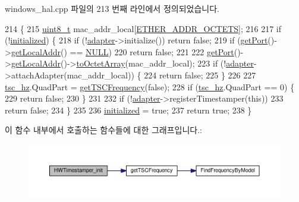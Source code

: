 windows\+\_\+hal.\+cpp 파일의 213 번째 라인에서 정의되었습니다.


\begin{DoxyCode}
214 \{
215     \hyperlink{stdint_8h_aba7bc1797add20fe3efdf37ced1182c5}{uint8\_t} mac\_addr\_local[\hyperlink{ptptypes_8hpp_ab81d402a4929723091a6731508845125}{ETHER\_ADDR\_OCTETS}];
216 
217     \textcolor{keywordflow}{if} (!\hyperlink{class_windows_wireless_timestamper_aedeffc7d23da25d52b9a50045189fe2b}{initialized}) \{
218         \textcolor{keywordflow}{if} (!\hyperlink{structadapter}{adapter}->initialize()) \textcolor{keywordflow}{return} \textcolor{keyword}{false};
219         \textcolor{keywordflow}{if} (\hyperlink{class_wireless_timestamper_aad42db1d6ccc40f2bebc5ba544d738d8}{getPort}()->\hyperlink{class_common_port_ab6607250666be12220407c6c12671f65}{getLocalAddr}() == \hyperlink{openavb__types__base__pub_8h_a070d2ce7b6bb7e5c05602aa8c308d0c4}{NULL})
220             \textcolor{keywordflow}{return} \textcolor{keyword}{false};
221 
222         \hyperlink{class_wireless_timestamper_aad42db1d6ccc40f2bebc5ba544d738d8}{getPort}()->\hyperlink{class_common_port_ab6607250666be12220407c6c12671f65}{getLocalAddr}()->\hyperlink{class_link_layer_address_a1e2896b540d2ea6182d351332737db91}{toOctetArray}(mac\_addr\_local);
223         \textcolor{keywordflow}{if} (!\hyperlink{structadapter}{adapter}->attachAdapter(mac\_addr\_local)) \{
224             \textcolor{keywordflow}{return} \textcolor{keyword}{false};
225         \}
226 
227         \hyperlink{class_windows_wireless_timestamper_a259066718bc34c6231bbefd0b7093b6e}{tsc\_hz}.QuadPart = \hyperlink{tsc_8hpp_a9da55c09944ef0da0cd43fcd0a5a3ee3}{getTSCFrequency}(\textcolor{keyword}{false});
228         \textcolor{keywordflow}{if} (\hyperlink{class_windows_wireless_timestamper_a259066718bc34c6231bbefd0b7093b6e}{tsc\_hz}.QuadPart == 0) \{
229             \textcolor{keywordflow}{return} \textcolor{keyword}{false};
230         \}
231 
232         \textcolor{keywordflow}{if} (!\hyperlink{structadapter}{adapter}->registerTimestamper(\textcolor{keyword}{this}))
233             \textcolor{keywordflow}{return} \textcolor{keyword}{false};
234     \}
235 
236     \hyperlink{class_windows_wireless_timestamper_aedeffc7d23da25d52b9a50045189fe2b}{initialized} = \textcolor{keyword}{true};
237     \textcolor{keywordflow}{return} \textcolor{keyword}{true};
238 \}
\end{DoxyCode}


이 함수 내부에서 호출하는 함수들에 대한 그래프입니다.\+:
\nopagebreak
\begin{figure}[H]
\begin{center}
\leavevmode
\includegraphics[width=350pt]{class_windows_wireless_timestamper_a7a098484ed16d09074217e92eb22d03d_cgraph}
\end{center}
\end{figure}




